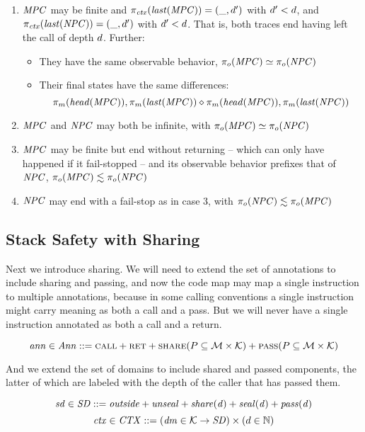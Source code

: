 \documentclass[acmsmall,review,anonymous]{acmart}\settopmatter{printfolios=true,printccs=false,printacmref=false}
\begin{document}
\begin{enumerate}
\item \(\mathit{MPC}\) may be finite and \(\pi_{\mathit{ctx}}(\mathit{last}(\mathit{MPC})) = (\_,d')\) with \(d' < d\),
  and \(\pi_{\mathit{ctx}}(\mathit{last}(\mathit{NPC})) = (\_,d')\) with \(d' < d\). That is, both traces end
  having left the call of depth \(d\). Further:
  \begin{itemize}
  \item They have the same observable behavior, \(\pi_o(\mathit{MPC}) \simeq \pi_o(\mathit{NPC})\)
  \item Their final states have the same differences:
    \[\pi_m(\mathit{head}(\mathit{MPC})), \pi_m(\mathit{last}(\mathit{MPC})) \diamond
    \pi_m(\mathit{head}(\mathit{MPC})), \pi_m(\mathit{last}(\mathit{NPC}))\]
  \end{itemize}
\item \(\mathit{MPC}\) and \(\mathit{NPC}\) may both be infinite, with \(\pi_o(\mathit{MPC}) \simeq \pi_o(\mathit{NPC})\)
\item \(\mathit{MPC}\) may be finite but end without returning -- which can only have happened if it fail-stopped --
  and its observable behavior prefixes that of \(\mathit{NPC}\), \(\pi_o(\mathit{MPC}) \lesssim \pi_o(\mathit{NPC})\)
\item \(\mathit{NPC}\) may end with a fail-stop as in case 3, with \(\pi_o(\mathit{NPC}) \lesssim \pi_o(\mathit{MPC})\)
\end{enumerate}

\subsection{Stack Safety with Sharing}

Next we introduce sharing. We will need to extend the set of annotations to include
sharing and passing, and now the code map may map a single instruction to multiple
annotations, because in some calling conventions a single instruction might carry
meaning as both a call and a pass. But we will never have a single instruction annotated
as both a call and a return.

\[\mathit{ann} \in \mathit{Ann} ::= \text{\sc call} + \text{\sc ret} + \text{\sc share}(P \subseteq {\mathcal M} \times {\mathcal K}) +
\text{\sc pass}(P \subseteq {\mathcal M} \times {\mathcal K})\]

And we extend the set of domains to include shared and passed components, the latter of
which are labeled with the depth of the caller that has passed them.

\[\mathit{sd} \in \mathit{SD} ::= \mathit{outside} + \mathit{unseal} + \mathit{share(d)} + \mathit{seal(d)} + \mathit{pass(d)}\]
\[\mathit{ctx} \in \mathit{CTX} ::= (\mathit{dm} \in {\mathcal K} \rightarrow \mathit{SD})
\times (d \in \mathbb{N}) \]
\end{document}
